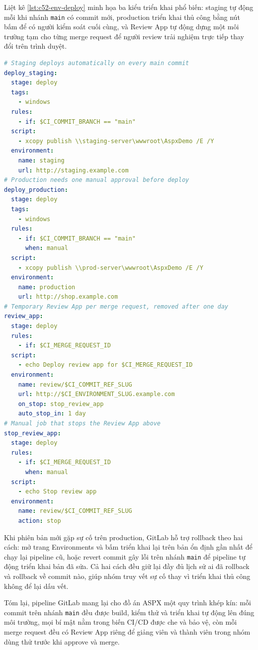Liệt kê \ref{lst:c52-env-deploy} minh họa ba kiểu triển khai phổ biến: staging tự động mỗi khi nhánh
\verb|main| có commit mới, production triển khai thủ công bằng nút bấm để có người kiểm soát cuối cùng,
và Review App tự động dựng một môi trường tạm cho từng merge request để người review trải nghiệm trực
tiếp thay đổi trên trình duyệt.
\begin{lstlisting}[language=yaml,caption={Môi trường staging, production và Review App},label={lst:c52-env-deploy}]
# Staging deploys automatically on every main commit
deploy_staging:
  stage: deploy
  tags:
    - windows
  rules:
    - if: $CI_COMMIT_BRANCH == "main"
  script:
    - xcopy publish \\staging-server\wwwroot\AspxDemo /E /Y
  environment:
    name: staging
    url: http://staging.example.com
# Production needs one manual approval before deploy
deploy_production:
  stage: deploy
  tags:
    - windows
  rules:
    - if: $CI_COMMIT_BRANCH == "main"
      when: manual
  script:
    - xcopy publish \\prod-server\wwwroot\AspxDemo /E /Y
  environment:
    name: production
    url: http://shop.example.com
# Temporary Review App per merge request, removed after one day
review_app:
  stage: deploy
  rules:
    - if: $CI_MERGE_REQUEST_ID
  script:
    - echo Deploy review app for $CI_MERGE_REQUEST_ID
  environment:
    name: review/$CI_COMMIT_REF_SLUG
    url: http://$CI_ENVIRONMENT_SLUG.example.com
    on_stop: stop_review_app
    auto_stop_in: 1 day
# Manual job that stops the Review App above
stop_review_app:
  stage: deploy
  rules:
    - if: $CI_MERGE_REQUEST_ID
      when: manual
  script:
    - echo Stop review app
  environment:
    name: review/$CI_COMMIT_REF_SLUG
    action: stop
\end{lstlisting}

Khi phiên bản mới gặp sự cố trên production, GitLab hỗ trợ rollback theo hai cách: mở trang
Environments và bấm triển khai lại trên bản ổn định gần nhất để chạy lại pipeline cũ, hoặc revert
commit gây lỗi trên nhánh \verb|main| để pipeline tự động triển khai bản đã sửa. Cả hai cách đều giữ
lại đầy đủ lịch sử ai đã rollback và rollback về commit nào, giúp nhóm truy vết sự cố thay vì triển
khai thủ công không để lại dấu vết.

Tóm lại, pipeline GitLab mang lại cho đồ án ASPX một quy trình khép kín: mỗi commit trên nhánh
\verb|main| đều được build, kiểm thử và triển khai tự động lên đúng môi trường, mọi bí mật nằm trong
biến CI/CD được che và bảo vệ, còn mỗi merge request đều có Review App riêng để giảng viên và thành
viên trong nhóm dùng thử trước khi approve và merge.
